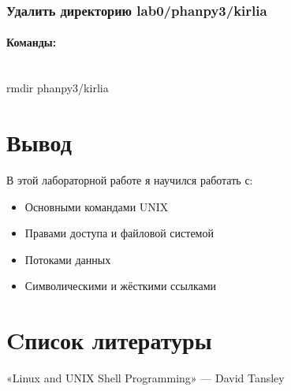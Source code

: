 \documentclass[12pt,onecolumn]{article}
\begin{document}
\subsubsection{Удалить директорию lab0/phanpy3/kirlia}
\paragraph{Команды:}
\hfill\\
rmdir phanpy3/kirlia
\section{Вывод}
В этой лабораторной работе я научился работать с:
\begin{itemize}
\item Основными командами UNIX 
\item Правами доступа и файловой системой
\item Потоками данных
\item Символическими и жёсткими ссылками
\end{itemize}
\section{Cписок литературы}
\begin{thebibliography}{0}
«Linux and UNIX Shell Programming» --- David Tansley
\end{thebibliography}
\end{document}
